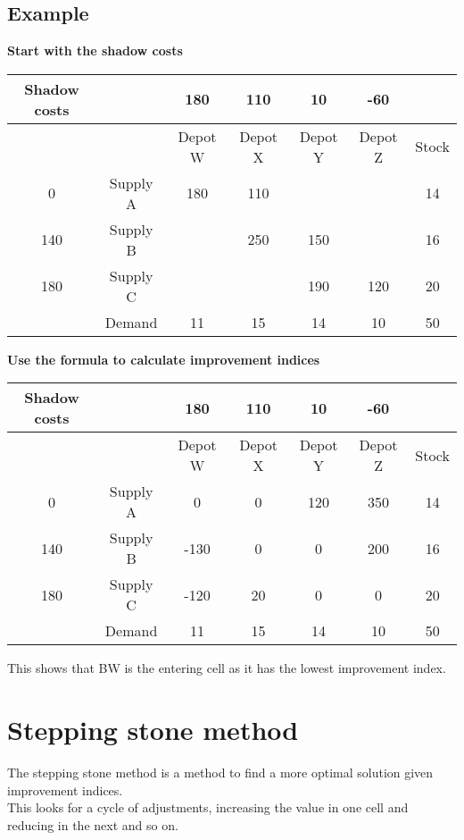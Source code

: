 \documentclass{article}[18pt]
\newcommand{\cred}[1]{\color{red}#1}
\newcommand{\cblue}[1]{\color{blue}#1}
\begin{document}
\subsection{Example}
\textbf{Start with the shadow costs}
\begin{center}
\begin{tabular}{ |c|c|c|c|c|c|c| }
\hline
Shadow costs&&180&110&10&-60&\\
\hline
&&Depot W&Depot X&Depot Y&Depot Z&Stock\\
\hline
0&Supply A&\cred{180}&\cred{110}&&&14\\
\hline
140&Supply B&&\cred{250}&\cred{150}&&16\\
\hline
180&Supply C&&&\cred{190}&\cred{120}&20\\
\hline
&Demand&11&15&14&10&50\\
\hline
\end{tabular}
\end{center}
\textbf{Use the formula to calculate improvement indices}\\
\begin{center}
\begin{tabular}{ |c|c|c|c|c|c|c| }
\hline
Shadow costs&&180&110&10&-60&\\
\hline
&&Depot W&Depot X&Depot Y&Depot Z&Stock\\
\hline
0&Supply A&\cred{0}&\cred{0}&\cblue{120}&\cblue{350}&14\\
\hline
140&Supply B&\cblue{-130}&\cred{0}&\cred{0}&\cblue{200}&16\\
\hline
180&Supply C&\cblue{-120}&\cblue{20}&\cred{0}&\cred{0}&20\\
\hline
&Demand&11&15&14&10&50\\
\hline
\end{tabular}
\end{center}
This shows that BW is the entering cell as it has the lowest improvement index.
\section{Stepping stone method}
The stepping stone method is a method to find a more optimal solution given improvement indices.\\
This looks for a cycle of adjustments, increasing the value in one cell and reducing in the next and so on.
\end{document}
